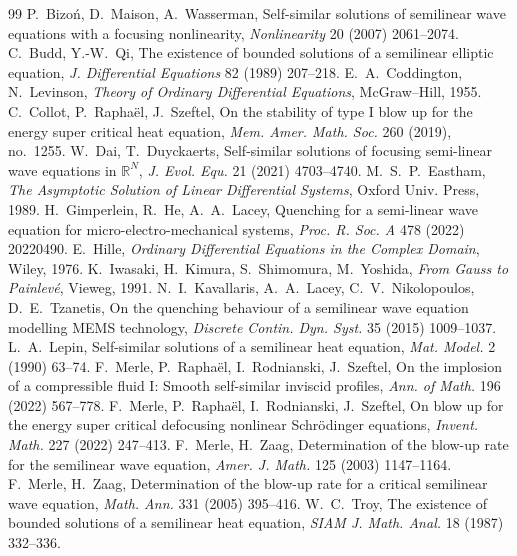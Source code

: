 \documentclass[11pt,a4paper]{amsart}
\theoremstyle{definition}
\theoremstyle{remark}
\newcommand{\R}{\mathbb{R}}
\begin{document}
\begin{thebibliography}{99}
 P.~Bizo\'n, D.~Maison, A.~Wasserman, Self-similar solutions of semilinear wave equations with a focusing nonlinearity, \emph{Nonlinearity} 20 (2007) 2061--2074.
 C.~Budd, Y.-W.~Qi, The existence of bounded solutions of a semilinear elliptic equation, \emph{J. Differential Equations} 82 (1989) 207--218.
 E.~A.~Coddington, N.~Levinson, \emph{Theory of Ordinary Differential Equations}, McGraw--Hill, 1955.
 C.~Collot, P.~Rapha\"el, J.~Szeftel, On the stability of type I blow up for the energy super critical heat equation, \emph{Mem. Amer. Math. Soc.} 260 (2019), no.~1255.
 W.~Dai, T.~Duyckaerts, Self-similar solutions of focusing semi-linear wave equations in $\R^N$, \emph{J. Evol. Equ.} 21 (2021) 4703--4740.
 M.~S.~P.~Eastham, \emph{The Asymptotic Solution of Linear Differential Systems}, Oxford Univ. Press, 1989.
 H.~Gimperlein, R.~He, A.~A.~Lacey, Quenching for a semi-linear wave equation for micro-electro-mechanical systems, \emph{Proc. R. Soc. A} 478 (2022) 20220490.
 E.~Hille, \emph{Ordinary Differential Equations in the Complex Domain}, Wiley, 1976.
 K.~Iwasaki, H.~Kimura, S.~Shimomura, M.~Yoshida, \emph{From Gauss to Painlev\'e}, Vieweg, 1991.
 N.~I.~Kavallaris, A.~A.~Lacey, C.~V.~Nikolopoulos, D.~E.~Tzanetis, On the quenching behaviour of a semilinear wave equation modelling MEMS technology, \emph{Discrete Contin. Dyn. Syst.} 35 (2015) 1009--1037.
 L.~A.~Lepin, Self-similar solutions of a semilinear heat equation, \emph{Mat. Model.} 2 (1990) 63--74.
 F.~Merle, P.~Rapha\"el, I.~Rodnianski, J.~Szeftel, On the implosion of a compressible fluid I: Smooth self-similar inviscid profiles, \emph{Ann. of Math.} 196 (2022) 567--778.
 F.~Merle, P.~Rapha\"el, I.~Rodnianski, J.~Szeftel, On blow up for the energy super critical defocusing nonlinear Schr\"odinger equations, \emph{Invent. Math.} 227 (2022) 247--413.
 F.~Merle, H.~Zaag, Determination of the blow-up rate for the semilinear wave equation, \emph{Amer. J. Math.} 125 (2003) 1147--1164.
 F.~Merle, H.~Zaag, Determination of the blow-up rate for a critical semilinear wave equation, \emph{Math. Ann.} 331 (2005) 395--416.
 W.~C.~Troy, The existence of bounded solutions of a semilinear heat equation, \emph{SIAM J. Math. Anal.} 18 (1987) 332--336.
\end{thebibliography}
\end{document}
